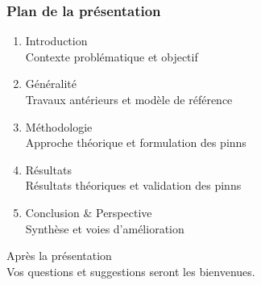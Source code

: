 \documentclass[handout]{beamer}
\newtheorem{pbm et hypo}[thm]{Problématique et hypothèses}
\begin{document}
	\begin{frame}
		\frametitle{\textbf{Plan de la présentation}}
		
		\begin{enumerate}
			\item \textcolor{red!80!black}{Introduction} \\ \small\textcolor{gray!70}{Contexte  problématique et objectif}
			\vspace{0.3cm}
			
			\item \textcolor{red!80!black}{Généralité} \\ \small\textcolor{gray!70}{Travaux antérieurs et modèle de référence}
			\vspace{0.3cm}
			
			\item \textcolor{red!80!black}{Méthodologie} \\ \small\textcolor{gray!70}{Approche théorique et formulation des pinns}
			\vspace{0.3cm}
			
			\item \textcolor{red!80!black}{Résultats} \\ \small\textcolor{gray!70}{Résultats théoriques et validation des pinns}
			\vspace{0.3cm}
			
			\item \textcolor{red!80!black}{Conclusion \& Perspective} \\ \small\textcolor{gray!70}{Synthèse et voies d'amélioration}
		\end{enumerate}
		
		\vspace{0.2cm}
	\begin{center}
			\footnotesize\textcolor{gray!60}{Après la présentation \\ Vos questions et suggestions seront les bienvenues.}
	\end{center}
	\end{frame}
\end{document}
